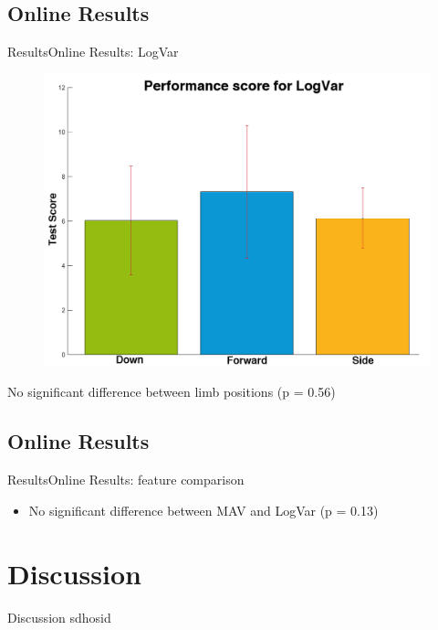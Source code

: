 \documentclass[10pt]{beamer}
\begin{document}
\subsection{Online Results}
\begin{frame}{Results}{Online Results: LogVar}
\begin{figure}
	\includegraphics[scale=0.27]{figures/gotItLogVar.png}
\end{figure}
No significant difference between limb positions (p = 0.56)
\end{frame}

\subsection{Online Results}
\begin{frame}{Results}{Online Results: feature comparison}
\begin{itemize}
	\item No significant difference between MAV and LogVar (p = 0.13)
\end{itemize}
\end{frame}



\section{Discussion}
\begin{frame}{Discussion}
sdhosid
\end{frame}



\end{document}
